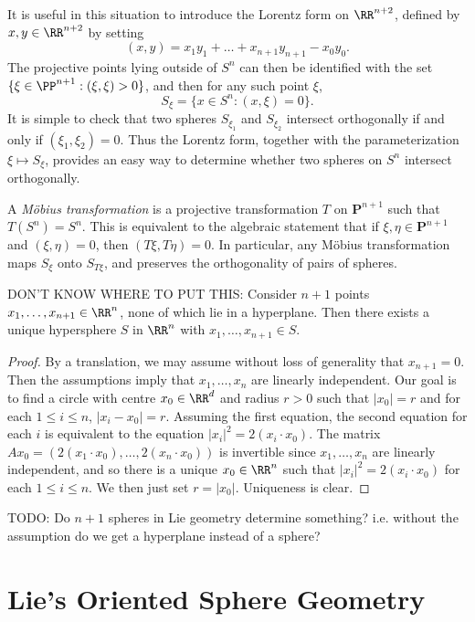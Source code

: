 It is useful in this situation to introduce the Lorentz form on $\RR^{n+2}$, defined by $x,y \in \RR^{n+2}$ by setting
%
\[ (x,y) = x_1 y_1 + \dots + x_{n+1} y_{n+1} - x_0 y_0. \]
%
The projective points lying outside of $S^n$ can then be identified with the set $\{ \xi \in \PP^{n+1} : (\xi,\xi) > 0 \}$, and then for any such point $\xi$,
%
\[ S_\xi = \{ x \in S^n : (x,\xi) = 0 \}. \]
%
It is simple to check that two spheres $S_{\xi_1}$ and $S_{\xi_2}$ intersect orthogonally if and only if $(\xi_1,\xi_2) = 0$. Thus the Lorentz form, together with the parameterization $\xi \mapsto S_\xi$, provides an easy way to determine whether two spheres on $S^n$ intersect orthogonally.

A \emph{M\"{o}bius transformation} is a projective transformation $T$ on $\mathbf{P}^{n+1}$ such that $T(S^n) = S^n$. This is equivalent to the algebraic statement that if $\xi,\eta \in \mathbf{P}^{n+1}$ and $(\xi,\eta) = 0$, then $(T\xi,T\eta) = 0$. In particular, any M\"{o}bius transformation maps $S_\xi$ onto $S_{T\xi}$, and preserves the orthogonality of pairs of spheres.

\begin{theorem}
    DON'T KNOW WHERE TO PUT THIS: Consider $n+1$ points $x_1,\dots,x_{n+1} \in \RR^n$, none of which lie in a hyperplane. Then there exists a unique hypersphere $S$ in $\RR^n$ with $x_1,\dots,x_{n+1} \in S$.
\end{theorem}
\begin{proof}
    By a translation, we may assume without loss of generality that $x_{n+1} = 0$. Then the assumptions imply that $x_1,\dots,x_n$ are linearly independent. Our goal is to find a circle with centre $x_0 \in \RR^d$ and radius $r > 0$ such that $|x_0| = r$ and for each $1 \leq i \leq n$, $|x_i - x_0| = r$. Assuming the first equation, the second equation for each $i$ is equivalent to the equation $|x_i|^2 = 2 (x_i \cdot x_0)$. The matrix $Ax_0 = (2(x_1 \cdot x_0), \dots, 2(x_n \cdot x_0))$ is invertible since $x_1,\dots,x_n$ are linearly independent, and so there is a unique $x_0 \in \RR^n$ such that $|x_i|^2 = 2(x_i \cdot x_0)$ for each $1 \leq i \leq n$. We then just set $r = |x_0|$. Uniqueness is clear.
\end{proof}

TODO: Do $n+1$ spheres in Lie geometry determine something? i.e. without the assumption do we get a hyperplane instead of a sphere?

\chapter{Lie's Oriented Sphere Geometry}

